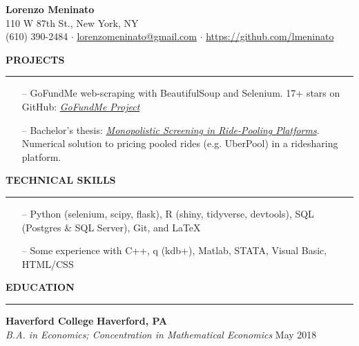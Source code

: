 \documentclass[paper=a4, fontsize=11pt]{scrartcl} %
\newcommand{\I}{--}
\newenvironment{mycenter}[1][\topsep]
  {\setlength{\topsep}{#1}\par\kern\topsep\centering}%
  {\par\kern\topsep}%
\newcommand*{\email}[1]{%
  \normalsize\href{mailto:#1}{#1}
  }
\begin{document}
\begin{mycenter}
\textbf{\LARGE Lorenzo Meninato} \\
110 W 87th St., New York, NY \\
(610) 390-2484 $\cdot$ \email{lorenzomeninato@gmail.com} $\cdot$ \href{https://github.com/lmeninato}{https://github.com/lmeninato}

\end{mycenter}

\begin{mycenter}[0pt]
\textsc{\textbf{PROJECTS}}
\end{mycenter}
\vspace{-3mm}
\rule{\textwidth}{0.4pt}
\begin{itemize}[topsep=0pt,noitemsep]
	\item[\I] GoFundMe web-scraping with BeautifulSoup and Selenium. 17+ stars on GitHub: \textit{\href{https://github.com/lmeninato/GoFundMe}{GoFundMe Project}}
	\item[\I] Bachelor's thesis: \textit{\href{https://github.com/lmeninato/ECON396/blob/master/Lorenzo\%20Meninato\%20Thesis.pdf}{Monopolistic Screening in Ride-Pooling Platforms}}. Numerical solution to pricing pooled rides (e.g. UberPool) in a ridesharing platform. 
\end{itemize}
\vspace{3mm}


\begin{mycenter}[0pt]
\textsc{\textbf{TECHNICAL SKILLS}}
\end{mycenter}
\vspace{-3mm}
\rule{\textwidth}{0.4pt}
\begin{itemize}[topsep=0pt,noitemsep]
	\item[\I] Python (selenium, scipy, flask), R (shiny, tidyverse, devtools), SQL (Postgres \& SQL Server), Git, and \LaTeX
	\item[\I] Some experience with C++, q (kdb+), Matlab, STATA, Visual Basic, HTML/CSS
\end{itemize}
\vspace{3mm}

\begin{mycenter}[0pt]
\textsc{\textbf{EDUCATION}}
\end{mycenter}

\vspace{-3mm}
\rule{\textwidth}{0.4pt}

\textbf{Haverford College} \hfill  \textbf{Haverford, PA} \\
\textit{B.A. in Economics; Concentration in Mathematical Economics} \hfill May 2018
\end{document}
